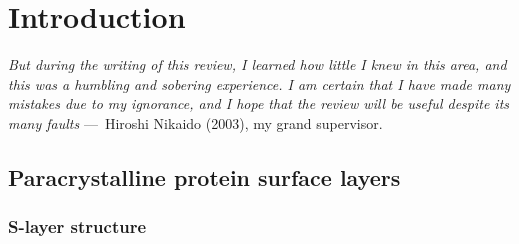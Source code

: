\acresetall

\chapter{Introduction}
\label{ch:Introduction}

\begin{epigraph}
    \emph{But during the writing of this review, I learned how little I knew in this area, and this was a humbling and sobering experience. I am certain that I have made many mistakes due to my ignorance, and I hope that the review will be useful despite its many faults} ---~Hiroshi Nikaido (2003), my grand supervisor.
\end{epigraph}

\section{Paracrystalline protein surface layers} %
\label{sec:paracrystalline_protein_surface_layers}

    \subsection{S-layer structure} %
    \label{sub:s_layer_structure}


